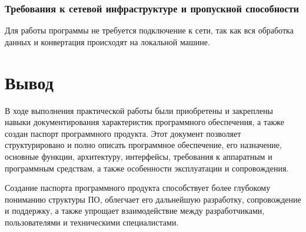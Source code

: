 \subsubsection{Требования к сетевой инфраструктуре и пропускной способности}

Для работы программы не требуется подключение к сети,
так как вся обработка данных и конвертация происходят на локальной машине.

\clearpage

\section*{\LARGE Вывод}

В ходе выполнения практической работы были приобретены
и закреплены навыки документирования характеристик программного обеспечения,
а также создан паспорт программного продукта.
Этот документ позволяет структурировано и
полно описать программное обеспечение, его назначение, основные функции,
архитектуру, интерфейсы, требования к аппаратным и программным средствам,
а также особенности эксплуатации и сопровождения.

Создание паспорта программного продукта способствует
более глубокому пониманию структуры ПО, облегчает его дальнейшую разработку,
сопровождение и поддержку,
а также упрощает взаимодействие между разработчиками,
пользователями и техническими специалистами.

